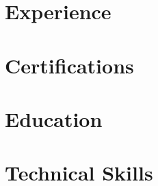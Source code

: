 \documentclass[a4paper]{article}
\begin{document}


\section{Experience}





% 
% 

\section{Certifications}

% 
% 

\section{Education}


\section{Technical Skills}



% 
% 
\end{document}
